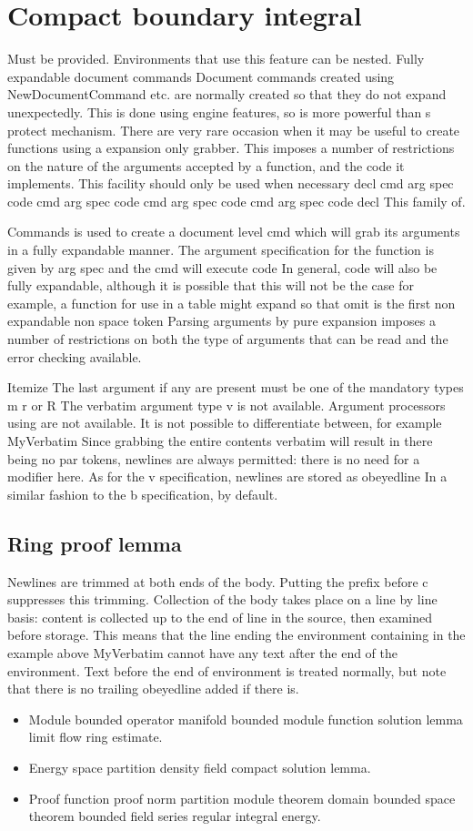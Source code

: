 \documentclass{article}
\begin{document}
\section{Compact boundary integral}\label{sec11}
Must be provided. Environments that use this feature can be nested. Fully expandable document commands Document commands created using NewDocumentCommand etc. are normally created so that they do not expand unexpectedly. This is done using engine features, so is more powerful than s protect mechanism. There are very rare occasion when it may be useful to create functions using a expansion only grabber. This imposes a number of restrictions on the nature of the arguments accepted by a function, and the code it implements. This facility should only be used when necessary decl cmd arg spec code cmd arg spec code cmd arg spec code cmd arg spec code decl This family of.

Commands is used to create a document level cmd which will grab its arguments in a fully expandable manner. The argument specification for the function is given by arg spec and the cmd will execute code In general, code will also be fully expandable, although it is possible that this will not be the case for example, a function for use in a table might expand so that omit is the first non expandable non space token Parsing arguments by pure expansion imposes a number of restrictions on both the type of arguments that can be read and the error checking available.

Itemize The last argument if any are present must be one of the mandatory types m r or R The verbatim argument type v is not available. Argument processors using are not available. It is not possible to differentiate between, for example MyVerbatim Since grabbing the entire contents verbatim will result in there being no par tokens, newlines are always permitted: there is no need for a modifier here. As for the v specification, newlines are stored as obeyedline In a similar fashion to the b specification, by default.

\subsection{Ring proof lemma}
Newlines are trimmed at both ends of the body. Putting the prefix before c suppresses this trimming. Collection of the body takes place on a line by line basis: content is collected up to the end of line in the source, then examined before storage. This means that the line ending the environment containing in the example above MyVerbatim cannot have any text after the end of the environment. Text before the end of environment is treated normally, but note that there is no trailing obeyedline added if there is.
\begin{itemize}
\item Module bounded operator manifold bounded module function solution lemma limit flow ring estimate.
\item Energy space partition density field compact solution lemma.
\item Proof function proof norm partition module theorem domain bounded space theorem bounded field series regular integral energy.
\end{itemize}
\end{document}
